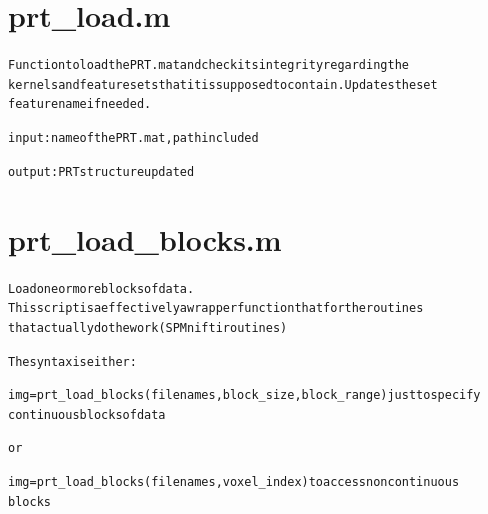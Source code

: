 \section{prt\_load.m}
\begin{alltt}

 Function to load the PRT.mat and check its integrity regarding the 
 kernels and feature sets that it is supposed to contain. Updates the  set
 feature name if needed.
 
 input  : name of the PRT.mat, path included
 
 output : PRT structure updated
\end{alltt}


\section{prt\_load\_blocks.m}
\begin{alltt}

 Load one or more blocks of data.
 This script is a effectively a wrapper function that for the routines
 that actually do the work (SPM nifti routines)
 
 The syntax is either:
 
 img = prt\_load\_blocks(filenames, block\_size, block\_range) just to specify
 continuous blocks of data
 
 or
 
 img = prt\_load\_blocks(filenames, voxel\_index) to access non continuous
 blocks
\end{alltt}


